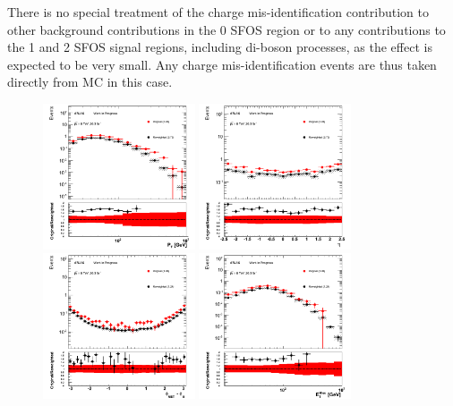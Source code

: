 There is no special treatment of the charge mis-identification contribution to 
other background contributions in the 0 SFOS region or to any contributions to the 
1 and 2 SFOS signal regions, including di-boson processes, as the effect is 
expected to be very small.  Any charge mis-identification events are thus 
taken directly from MC in this case.


 \begin{figure}[htp]
 \centering
 \includegraphics[width=0.4\textwidth]{figures/ChargeMisID/Validation_ChargeMisIDRates_WZ_PTLepton.png}
 \includegraphics[width=0.4\textwidth]{figures/ChargeMisID/Validation_ChargeMisIDRates_WZ_EtaLepton.png}
 \includegraphics[width=0.4\textwidth]{figures/ChargeMisID/Validation_ChargeMisIDRates_WZ_DeltaPhi.png}
 \includegraphics[width=0.4\textwidth]{figures/ChargeMisID/Validation_ChargeMisIDRates_WZ_MET.png}

\end{figure}
